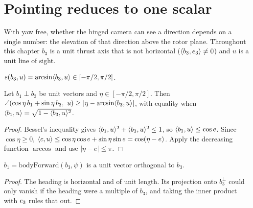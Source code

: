 \chapter{Pointing reduces to one scalar}
\label{chap:pointing}

With yaw free, whether the hinged camera can see a direction depends on a single
number: the elevation of that direction above the rotor plane. Throughout this
chapter $b_3$ is a unit thrust axis that is not horizontal
($\langle b_3, e_3 \rangle\neq0$) and $u$ is a unit line of sight.

\begin{definition}
\label{def:elevation}
\leanok
$e(b_3,u)=\arcsin\langle b_3, u \rangle\in[-\pi/2,\pi/2]$.
\end{definition}

\begin{lemma}
\label{lem:orthonormal-bound}
\leanok
Let $b_1\perp b_3$ be unit vectors and $\eta\in[-\pi/2,\pi/2]$. Then
$\ang(\cos\eta\,b_1+\sin\eta\,b_3,\ u)\ge|\eta-\arcsin\inner{b_3}{u}|$, with
equality when $\langle b_1, u \rangle=\sqrt{1-\langle b_3, u \rangle^2}$.
\end{lemma}

\begin{proof}
\leanok
Bessel's inequality gives $\langle b_1, u \rangle^2+\langle b_3, u \rangle^2\le1$, so
$\langle b_1, u \rangle\le\cos e$. Since $\cos\eta\ge0$,
$\langle c, u \rangle\le\cos\eta\cos e+\sin\eta\sin e=\cos(\eta-e)$. Apply the decreasing
function $\arccos$ and use $|\eta-e|\le\pi$.
\end{proof}

\begin{lemma}
\label{lem:body-forward}
\leanok
{}
$b_1=\mathrm{bodyForward}(b_3,\psi)$ is a unit vector orthogonal to $b_3$.
\end{lemma}

\begin{proof}
\leanok
The heading is horizontal and of unit length. Its projection onto $b_3^\perp$ could
only vanish if the heading were a multiple of $b_3$, and taking the inner product
with $e_3$ rules that out.
\end{proof}

